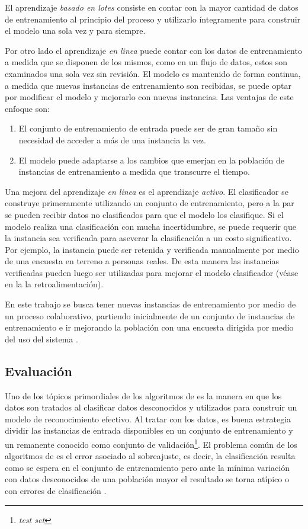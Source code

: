 El aprendizaje \emph{basado en lotes} consiste en contar con la mayor
cantidad de datos de entrenamiento al principio del proceso y utilizarlo
íntegramente para construir el modelo una sola vez y para siempre. 

Por otro lado el aprendizaje \emph{en linea} puede contar con los
datos de entrenamiento a medida que se disponen de los mismos, como
en un flujo de datos, estos son examinados una sola vez sin revisión.
El modelo es mantenido de forma continua, a medida que nuevas instancias
de entrenamiento son recibidas, se puede optar por modificar el modelo
y mejorarlo con nuevas instancias. Las ventajas de este enfoque son: 
\begin{enumerate}
\item El conjunto de entrenamiento de entrada puede ser de gran tamaño sin
necesidad de acceder a más de una instancia la vez. 
\item El modelo puede adaptarse a los cambios que emerjan en la población
de instancias de entrenamiento a medida que transcurre el tiempo.
\end{enumerate}
Una mejora del aprendizaje \emph{en linea} es el aprendizaje \emph{activo}.
El clasificador se construye primeramente utilizando un conjunto de
entrenamiento, pero a la par se pueden recibir datos no clasificados
para que el modelo los clasifique. Si el modelo realiza una clasificación
con mucha incertidumbre, se puede requerir que la instancia sea verificada
para aseverar la clasificación a un costo significativo. Por ejemplo,
la instancia puede ser retenida y verificada manualmente por medio
de una encuesta en terreno a personas reales. De esta manera las instancias
verificadas pueden luego ser utilizadas para mejorar el modelo clasificador
(véase en la  la retroalimentación). 

En este trabajo se busca tener nuevas instancias de entrenamiento
por medio de un proceso colaborativo, partiendo inicialmente de un
conjunto de instancias de entrenamiento e ir mejorando la población
con una encuesta dirigida por medio del uso del sistema .

\subsection{Evaluación}

Uno de los tópicos primordiales de los algoritmos de  es
la manera en que los datos son tratados al clasificar datos desconocidos
y utilizados para construir un modelo de reconocimiento efectivo.
Al tratar con los datos, es buena estrategia dividir las instancias
de entrada disponibles en un conjunto de entrenamiento y un remanente
conocido como conjunto de validación\emph{}\footnote{\emph{test set}}.
El problema común de los algoritmos de  es el error asociado
al sobreajuste, es decir, la clasificación resulta como se espera
en el conjunto de entrenamiento pero ante la mínima variación con
datos desconocidos de una población mayor el resultado se torna atípico
o con errores de clasificación \cite{Rajaraman2011}. 

